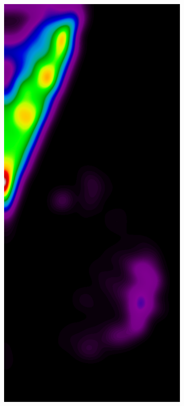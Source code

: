 \begin{figure}[h!]
	\centering
	\begin{subfigure}{0.195\textwidth}
		\centering
			\includegraphics[width=\textwidth]{plots/examples/example4_probs_1_1.png}

\end{subfigure}
\end{figure}
